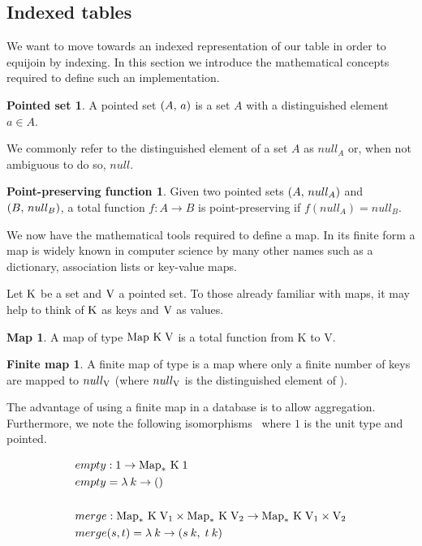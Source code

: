 \subsection{Indexed tables}
We want to move towards an indexed representation of our table in order to
equijoin by indexing. In this section we introduce the mathematical concepts required to define such an implementation.
\theoremstyle{definition}\newtheorem*{psetdef}{Pointed set}
\theoremstyle{definition}\newtheorem*{ppfuncdef}{Point-preserving function}
\theoremstyle{definition}\newtheorem*{mapdef}{Map}
\theoremstyle{definition}\newtheorem*{finitemapdef}{Finite map}
\theoremstyle{definition}\newtheorem*{indexedtabledef}{Indexed Table}
\begin{psetdef}\label{def:pset}
  A pointed set $\left(A,\,a\right)$ is a set $A$ with a distinguished element $a \in A$.
\end{psetdef}
We commonly refer to the distinguished element of a set $A$ as $null_A$ or, when not ambiguous to do so, $null$.
\begin{ppfuncdef}\label{def:ppfunc}
  Given two pointed sets $\left(A,\,null_A\right)$ and $\left(B,\,null_B\right)$, a total function $f: A \rightarrow B$ is point-preserving if $f(null_A) = null_B$.
\end{ppfuncdef}

We now have the mathematical tools required to define a map. In its finite form a map is widely known in computer science by many other names such as a dictionary, association lists or key-value maps.

Let $\mathrm{K}$ be a set and $\mathrm{V}$ a pointed set. To those already familiar with maps, it may help to think of $\mathrm{K}$ as keys and $\mathrm{V}$ as values.
\begin{mapdef}
  A map of type $\mathrm{Map}\ \mathrm{K}\;\mathrm{V}$ is a total function from K to V.
\end{mapdef}
\begin{finitemapdef}
  A finite map of type \finitemap{\keyset}{\valset} is a map where only a finite number of keys are mapped to $null_{\mathrm{V}}$ (where $null_{\mathrm{V}}$ is the distinguished element of \valset). 
\end{finitemapdef}
The advantage of using a finite map in a database is to allow aggregation.
Furthermore, we note the following
isomorphisms~\cite{RelationalAlgebraByWayOfAdjunctions} where $1$ is the unit
type and pointed.

\begin{equation*}
\begin{split}
    & empty: 1 \rightarrow \mathrm{Map}_*\ \mathrm{K}\;1 \\
    & empty = \lambda\:k \rightarrow () \\
    \\
    & merge: \mathrm{Map}_*\ \mathrm{K}\;\mathrm{V}_1 \times \mathrm{Map}_*\ \mathrm{K}\;\mathrm{V}_2
             \rightarrow \mathrm{Map}_*\ \mathrm{K}\;\mathrm{V}_1 \times \mathrm{V}_2 \\
    & merge (s, t) = \lambda\:k \rightarrow (s\:k,\;t\:k) \\
\end{split}
\end{equation*}

